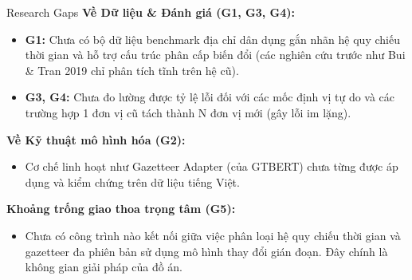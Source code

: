 \documentclass[aspectratio=169,9pt]{beamer}
\begin{document}
\begin{frame}{Research Gaps}
  \textbf{Về Dữ liệu \& Đánh giá (G1, G3, G4):}
  \begin{itemize}
    \setlength{\itemsep}{2.5pt}
    \item \textbf{G1:} Chưa có bộ dữ liệu benchmark địa chỉ dân dụng gắn nhãn hệ quy chiếu thời gian và hỗ trợ cấu trúc phân cấp biến đổi (các nghiên cứu trước như Bui \& Tran 2019 chỉ phân tích tĩnh trên hệ cũ).
    \item \textbf{G3, G4:} Chưa đo lường được tỷ lệ lỗi đối với các mốc định vị tự do và các trường hợp 1 đơn vị cũ tách thành N đơn vị mới (gây lỗi im lặng).
  \end{itemize}

  \vspace{0.2cm}
  \textbf{Về Kỹ thuật mô hình hóa (G2):}
  \begin{itemize}
    \setlength{\itemsep}{2.5pt}
    \item Cơ chế linh hoạt như Gazetteer Adapter (của GTBERT) chưa từng được áp dụng và kiểm chứng trên dữ liệu tiếng Việt.
  \end{itemize}

  \vspace{0.2cm}
  \textbf{Khoảng trống giao thoa trọng tâm (G5):}
  \begin{itemize}
    \setlength{\itemsep}{2.5pt}
    \item Chưa có công trình nào kết nối giữa việc phân loại hệ quy chiếu thời gian và gazetteer đa phiên bản sử dụng mô hình thay đổi gián đoạn. Đây chính là không gian giải pháp của đồ án.
  \end{itemize}
\end{frame}
\end{document}
